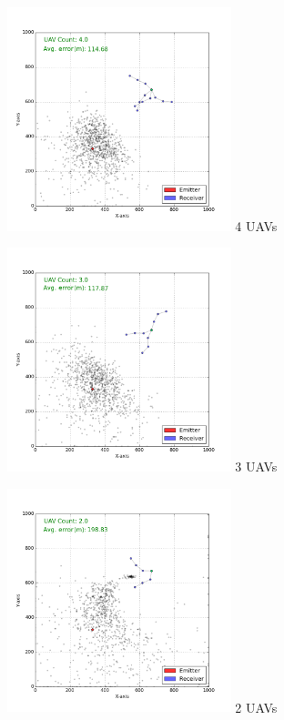 \documentclass[10pt,a4paper]{book}
\begin{document}
\begin{figure}[H]
\centering
\begin{minipage}{60mm}
  \centering
\includegraphics[width=65mm]{3_steps/Generation_1000/Pareto_4.png}
  4 \glspl{UAV}
\end{minipage}
\begin{minipage}{60mm}
  \centering
\includegraphics[width=65mm]{3_steps/Generation_1000/Pareto_5.png}
  3 \glspl{UAV}
\end{minipage}
\begin{minipage}{60mm}
  \centering
\includegraphics[width=65mm]{3_steps/Generation_1000/Pareto_6.png}
  2 \glspl{UAV}
\end{minipage}

\end{figure}
\end{document}
